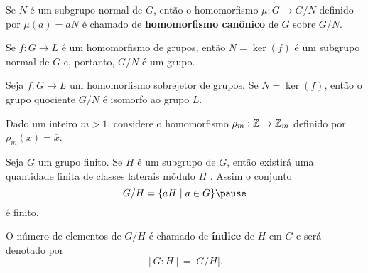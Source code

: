 \documentclass{beamer}
\begin{document}
    \begin{frame}
        \begin{definicao}
            Se $N$ é um subgrupo normal de $G$, \pause então o homomorfismo $\mu : G \to G/N$ \pause definido por $\mu(a) = aN$ \pause é chamado de \textbf{homomorfismo can\^onico} \pause de $G$ sobre $G/N$.
        \end{definicao}
    \end{frame}

    \begin{frame}
        \begin{lema}
            Se $f : G \to L$ é um homomorfismo de grupos, \pause então $N = \ker(f)$ \pause é um subgrupo normal de $G$ \pause e, portanto, $G/N$ é um grupo.
        \end{lema}
    \end{frame}

    \begin{frame}
        \begin{teorema}
            Seja $f : G \to L$ um homomorfismo sobrejetor \pause de grupos. \pause Se $N = \ker(f)$, \pause então o grupo quociente $G/N$ é isomorfo ao grupo $L$.
        \end{teorema}
    \end{frame}

    \begin{frame}
        \begin{exemplo}
            Dado um inteiro $m > 1$, \pause considere o homomorfismo $\rho_m : \mathbb{Z} \to \mathbb{Z}_m$ \pause definido por $\rho_m(x) = \overline{x}$.
        \end{exemplo}
    \end{frame}

    \begin{frame}
        Seja $G$ um grupo finito. \pause Se $H$ é um subgrupo de $G$, \pause então existirá uma quantidade finita de classes laterais m\'odulo $H$ \pause.
        Assim o conjunto
        \[
            G/H = \{aH \mid a \in G\} \pause
        \]
        é finito. \pause

        O número de elementos de $G/H$ \pause é chamado de \textbf{índice} \pause de $H$ em $G$ \pause e será denotado por
        \[
            [G : H] = |G/H|.
        \]
    \end{frame}
\end{document}
